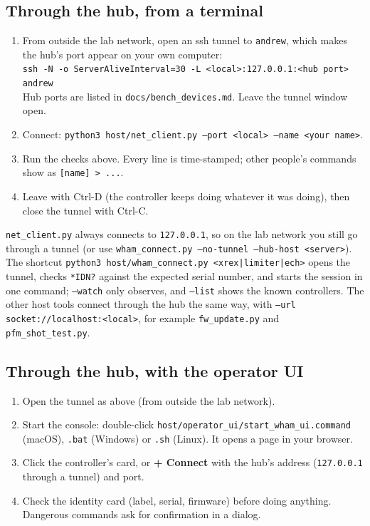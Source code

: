\documentclass[11pt]{article}
\newcommand{\code}[1]{\texttt{#1}}
\newcommand{\file}[1]{\nolinkurl{#1}}
\begin{document}
\subsection{Through the hub, from a terminal}
\begin{enumerate}
  \item From outside the lab network, open an ssh tunnel to \code{andrew}, which makes the hub's port appear on your own computer:\\
    \code{ssh -N -o ServerAliveInterval=30 -L <local>:127.0.0.1:<hub port> andrew}\\
    Hub ports are listed in \file{docs/bench_devices.md}. Leave the tunnel window open.
  \item Connect: \code{python3 host/net\_client.py --port <local> --name <your name>}.
  \item Run the checks above. Every line is time-stamped; other people's commands show as \code{[name] > ...}.
  \item Leave with Ctrl-D (the controller keeps doing whatever it was doing), then close the tunnel with Ctrl-C.
\end{enumerate}
\code{net\_client.py} always connects to \code{127.0.0.1}, so on the lab network you still go through a tunnel (or use \code{wham\_connect.py --no-tunnel --hub-host <server>}).
The shortcut \code{python3 host/wham\_connect.py <xrex|limiter|ech>} opens the tunnel, checks \code{*IDN?} against the expected serial number, and starts the session in one command; \code{--watch} only observes, and \code{--list} shows the known controllers.
The other host tools connect through the hub the same way, with \code{--url socket://localhost:<local>}, for example \code{fw\_update.py} and \code{pfm\_shot\_test.py}.

\subsection{Through the hub, with the operator UI}
\begin{enumerate}
  \item Open the tunnel as above (from outside the lab network).
  \item Start the console: double-click \file{host/operator_ui/start_wham_ui.command} (macOS), \code{.bat} (Windows) or \code{.sh} (Linux). It opens a page in your browser.
  \item Click the controller's card, or \textbf{+ Connect} with the hub's address (\code{127.0.0.1} through a tunnel) and port.
  \item Check the identity card (label, serial, firmware) before doing anything. Dangerous commands ask for confirmation in a dialog.
\end{enumerate}
\end{document}
